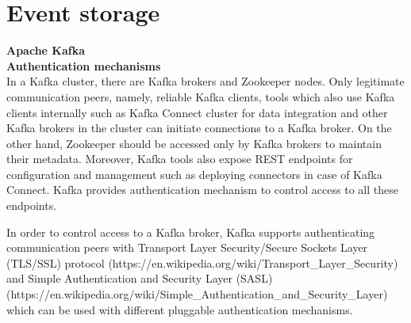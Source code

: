 \section{Event storage} \label{section:security}
\large \textbf{Apache Kafka}\\
\normalsize
\textbf{Authentication mechanisms}\\
In a Kafka cluster, there are Kafka brokers and Zookeeper nodes. Only legitimate communication peers, namely, reliable Kafka clients, tools which also use Kafka clients internally such as Kafka Connect cluster for data integration and other Kafka brokers in the cluster can initiate connections to a Kafka broker. On the other hand, Zookeeper should be accessed only by Kafka brokers to maintain their metadata. Moreover, Kafka tools also expose REST endpoints for configuration and management such as deploying connectors in case of Kafka Connect. Kafka provides authentication mechanism to control access to all these endpoints.

In order to control access to a Kafka broker, Kafka supports authenticating communication peers with  Transport Layer  Security/Secure Sockets Layer (TLS/SSL) protocol (https://en.wikipedia.org/wiki/Transport_Layer_Security) and Simple Authentication and  Security Layer (SASL) (https://en.wikipedia.org/wiki/Simple_Authentication_and_Security_Layer) which can be used with different pluggable authentication mechanisms. 

